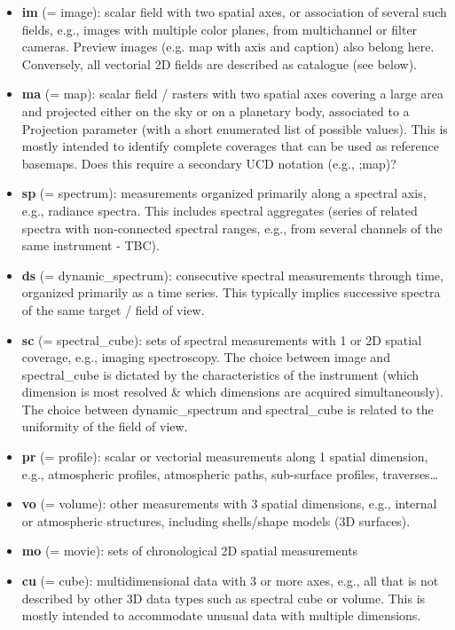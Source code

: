 \documentclass[11pt,a4paper]{ivoa}
\begin{document}
\begin{itemize}
\item \textbf{im }(= image): scalar field with two spatial axes, or association of several such fields, e.g., images with multiple color planes, from multichannel or filter cameras. Preview images (e.g. map with axis and caption) also belong here. Conversely, all vectorial 2D fields are described as catalogue (see below). \\
\item \textbf{ma }(= map): scalar field / rasters with two spatial axes covering a large area and projected either on the sky or on a planetary body, associated to a Projection parameter (with a short enumerated list of possible values). This is mostly intended to identify complete coverages that can be used as reference basemaps. Does this require a secondary UCD notation (e.g., ;map)?\\
\item \textbf{sp }(= spectrum): measurements organized primarily along a spectral axis, e.g., radiance spectra. This includes spectral aggregates (series of related spectra with non-connected spectral ranges, e.g., from several channels of the same instrument - TBC).
\item \textbf{ds }(= dynamic\_spectrum): consecutive spectral measurements through time, organized primarily as a time series. This typically implies successive spectra of the same target / field of view.
\item \textbf{sc }(= spectral\_cube): sets of spectral measurements with 1 or 2D spatial coverage, e.g., imaging spectroscopy. The choice between image and spectral\_cube is dictated by the characteristics of the instrument (which dimension is most resolved \& which dimensions are acquired simultaneously). The choice between dynamic\_spectrum and spectral\_cube is related to the uniformity of the field of view.
\item \textbf{pr }(= profile): scalar or vectorial measurements along 1 spatial dimension, e.g., atmospheric profiles, atmospheric paths, sub-surface profiles, traverses…
\item \textbf{vo }(= volume): other measurements with 3 spatial dimensions, e.g., internal or atmospheric structures, including shells/shape models (3D surfaces).
\item \textbf{mo }(= movie): sets of chronological 2D spatial measurements
\item \textbf{cu }(= cube): multidimensional data with 3 or more axes, e.g., all that is not described by other 3D data types such as spectral cube or volume. This is mostly intended to accommodate unusual data with multiple dimensions.

\end{itemize}
\end{document}
